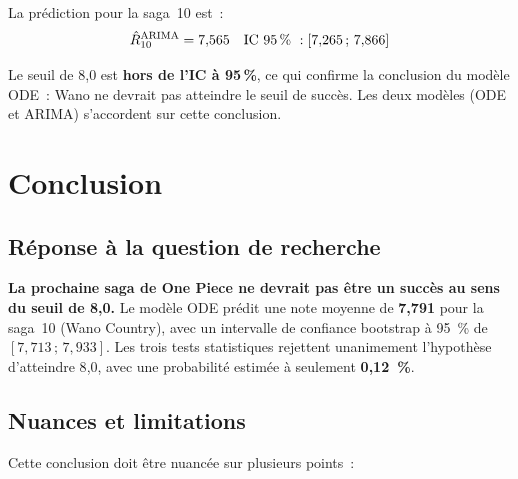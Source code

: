 \documentclass[a4paper,12pt,french]{article}
\begin{document}
La prédiction pour la saga~10 est~:
\begin{equation}
  \hat{R}_{10}^{\text{ARIMA}} = 7{,}565
  \quad \text{IC 95\,\%}~: \left[7{,}265\,;\, 7{,}866\right]
\end{equation}

Le seuil de 8{,}0 est \textbf{hors de l'IC à 95\,\%}, ce qui confirme
la conclusion du modèle ODE~: Wano ne devrait pas atteindre le seuil de succès.
Les deux modèles (ODE et ARIMA) s'accordent sur cette conclusion.

\newpage
\section{Conclusion}

\subsection{Réponse à la question de recherche}

\textbf{La prochaine saga de One Piece ne devrait pas être un succès au sens du
seuil de 8{,}0.} Le modèle ODE prédit une note moyenne de \textbf{7{,}791}
pour la saga~10 (Wano Country), avec un intervalle de confiance bootstrap à 95~\%
de $[7{,}713\,;\, 7{,}933]$. Les trois tests statistiques rejettent unanimement
l'hypothèse d'atteindre 8{,}0, avec une probabilité estimée à seulement
\textbf{0{,}12~\%}.

\subsection{Nuances et limitations}

Cette conclusion doit être nuancée sur plusieurs points~:
\end{document}

